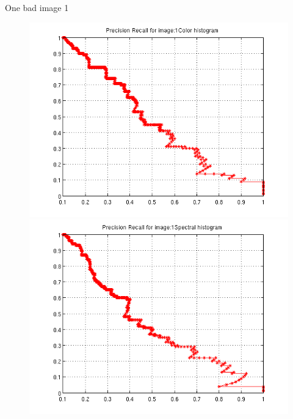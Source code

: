 \documentclass[a4paper,12pt]{article}
\begin{document}
One bad image 1
\begin{figure}[h!]
    \centering
    \includegraphics[totalheight=.24\textheight]{../Results/PR/BadColor.png}
    \includegraphics[totalheight=.24\textheight]{../Results/PR/BadSpectral.png}
\end{figure}
\end{document}

